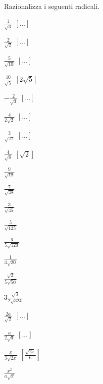 \begin{esercizio}[\Ast]
 \label{ese:2.68}
Razionalizza i seguenti radicali.
 \begin{multicols}{4}
 \begin{enumeratea}
 \item $\frac 1{\sqrt 3}$
  \hfill $\left[...\right]$
 \item $\frac 2{\sqrt 2}$
  \hfill $\left[...\right]$
 \item $\frac 5{\sqrt{10}}$
  \hfill $\left[...\right]$
 \item $\frac{10}{\sqrt 5}$
  \hfill $\left[2\sqrt 5\right]$
 \item $-\frac 2{\sqrt 3}$
  \hfill $\left[...\right]$
 \item $\frac 4{2\sqrt 2}$
  \hfill $\left[...\right]$
 \item $\frac 3{\sqrt{27}}$
  \hfill $\left[...\right]$
 \item $\frac 4{\sqrt 8}$
  \hfill $\left[\sqrt 2\right]$
 \item $\frac 9{\sqrt{18}}$
 \item $\frac 7{\sqrt{48}}$
 \item $\frac 3{\sqrt{45}}$
 \item $\frac 5{\sqrt{125}}$
 \item $\frac 6{5\sqrt{120}}$
 \item $\frac 1{3\sqrt{20}}$
 \item $\frac{\sqrt 2}{5\sqrt{50}}$
 \item $3\frac{\sqrt 3}{2\sqrt{324}}$
 \item $\frac{2a}{\sqrt 2}$
  \hfill $\left[...\right]$
 \item $\frac a{2\sqrt a}$
  \hfill $\left[...\right]$
 \item $\frac x{3\sqrt{2x}}$
  \hfill $\left[\frac{\sqrt{2x}} 6\right]$
 \item $\frac{x^2}{a\sqrt x}$

\end{enumeratea}
\end{multicols}
\end{esercizio}
